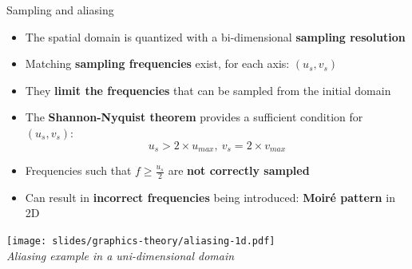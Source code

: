 \begin{frame}{Sampling and aliasing}
  \begin{itemize}
  \item The spatial domain is quantized with a bi-dimensional \textbf{sampling resolution}
  \item Matching \textbf{sampling frequencies} exist, for each axis: \((u_s,v_s)\)
  \item They \textbf{limit the frequencies} that can be sampled from the initial domain
  \item The \textbf{Shannon-Nyquist theorem} provides a sufficient condition for \((u_s,v_s)\):
\[
u_s > 2 \times u_{max}, ~v_s = 2 \times v_{max}
\]
  \item Frequencies such that \(f \geq \frac{u_s}{2}\) are \textbf{not correctly sampled}
  \item Can result in \textbf{incorrect frequencies} being introduced: \textbf{Moiré pattern} in 2D
  \end{itemize}

  \begin{center}
  \texttt{[image: slides/graphics-theory/aliasing-1d.pdf]}\\
  \textit{\small Aliasing example in a uni-dimensional domain}
  \end{center}
\end{frame}

